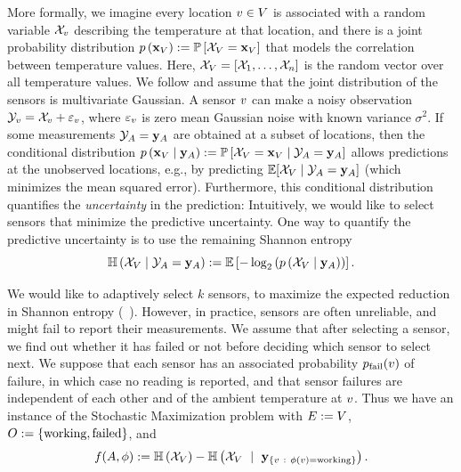 %
%
More formally, we imagine every location $v\in V$ is associated with a random variable ${\mathcal{X}}_{v}$ 
describing the temperature at that location, and there is a joint probability
distribution ${\color{black}{\ensuremath{p \left( {{\mathbf{x}}_{V}} \right) }}} := \mathbb{P}\left[{\mathcal{X}}_{V} = {\mathbf{x}}_{V}\right] $ that models the correlation between temperature
values.  Here, ${\mathcal{X}}_{V}=[{\mathcal{X}}_{1},\dots,{\mathcal{X}}_{n}]$ is
the random vector over all temperature values. We follow \citet{vldb04} and assume that the joint distribution of the sensors is multivariate Gaussian.
A sensor $v$ can make a noisy observation ${\mathcal{Y}}_{v}={\mathcal{X}}_{v}+\varepsilon_{v}$, where $\varepsilon_{v}$ is zero mean Gaussian noise with known variance $\sigma^{2}$.  
If some measurements ${\mathcal{Y}}_{A}={\mathbf{y}}_{A}$ are obtained at a subset of locations, then the
conditional distribution
${\color{black}{\ensuremath{p \left( {{\mathbf{x}}_{V} \mid {\mathbf{y}}_{A}} \right) }}} := \mathbb{P}\left[{\mathcal{X}}_{V} =
    {\mathbf{x}}_{V} \mid{\mathcal{Y}}_{A}={\mathbf{y}}_{A}\right] $ allows
predictions at the unobserved locations, e.g., by predicting
$\mathbb{E}[{\mathcal{X}}_{V}\mid{\mathcal{Y}}_{A}={\mathbf{y}}_{A}]$ (which minimizes the mean squared error).
Furthermore, this conditional distribution quantifies the
\emph{uncertainty} in the prediction: Intuitively, we would like to
select sensors that minimize the predictive uncertainty.  One way to
quantify the predictive uncertainty is to use the remaining
Shannon entropy 
$$\mathbb{H} \left( { {\mathcal{X}}_{V}\mid{\mathcal{Y}}_{A} = {\mathbf{y}}_{A} } \right) 
:= \mathbb{E}\left[-\log_2  \left( {{\color{black}{\ensuremath{p \left( { {\mathcal{X}}_{V}\mid {\mathbf{y}}_{A} } \right) }}}} \right) \right].$$

\noindent {} We would like to adaptively select  $k$
sensors, to maximize the expected reduction in Shannon entropy (\cf~\citet{Sebastiani2000,KrauseG09}).  However, in practice, sensors are often unreliable, and might fail to report their measurements. We assume that after selecting a sensor, we find out whether it has failed or not 
before deciding which  sensor to select next.  We suppose that each sensor has an associated probability $p_{\text{fail}}\! \left( {v} \right) $ of failure, in which case no reading is reported, and that sensor failures are independent of each other and of the ambient temperature at $v$.
Thus we have an instance of the Stochastic Maximization problem with $E := V$, 
$O := \left\{\text{working}, \text{failed}\right\}$, and 
\begin{equation}
  \label{eq:exp-obj}
f(A, {\color{black}{\ensuremath{\phi}}}) := \mathbb{H} \left( { {\mathcal{X}}_{V}} \right)  - \mathbb{H} \left( { {\mathcal{X}}_{V}
 \  \mid \ {\mathbf{y}}_{ \left\{  v \ : \ {\color{black}{\ensuremath{\phi}}}(v) = \text{working}  \right\}  }   } \right)   .
\end{equation}

